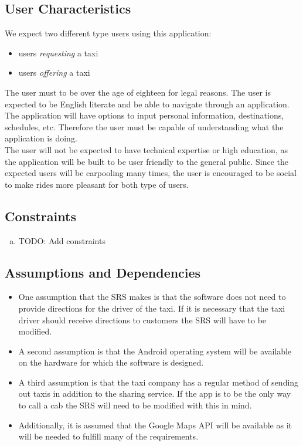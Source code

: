 \documentclass[english]{article}
\begin{document}
\subsection{User Characteristics}
\label{sub:user_characteristics}
We expect two different type users using this application: 
\begin{itemize}
    \item users \textit{requesting} a taxi
    \item users \textit{offering} a taxi
\end{itemize}
The user must to be over the age of eighteen for legal reasons. The user is expected to be English literate and be able to navigate through an application. The application will have options to input personal information, destinations, schedules, etc. Therefore the user must be capable of understanding what the application is doing.
\\
\bigskip
The user will not be expected to have technical expertise or high education, as the application will be built to be user friendly to the general public. Since the expected users will be carpooling many times, the user is encouraged to be social to make rides more pleasant for both type of users. 

\subsection{Constraints}
\label{sub:constraints}
\begin{enumerate}[a)]
	\item TODO: Add constraints
\end{enumerate}

\subsection{Assumptions and Dependencies}
\label{sub:assumptions_and_dependencies}
\begin{itemize}
	\item One assumption that the SRS makes is that the software does not need to provide directions for the driver of the taxi. If it is necessary that the taxi driver should receive directions to customers the SRS will have to be modified.
	
	\item A second assumption is that the Android operating system will be available on the hardware for which the software is designed.
	
	\item A third assumption is that the taxi company has a regular method of sending out taxis in addition to the sharing service. If the app is to be the only way to call a cab the SRS will need to be modified with this in mind.

	\item Additionally, it is assumed that the Google Maps API will be available as it will be needed to fulfill many of the requirements.
\end{itemize}
\end{document}
